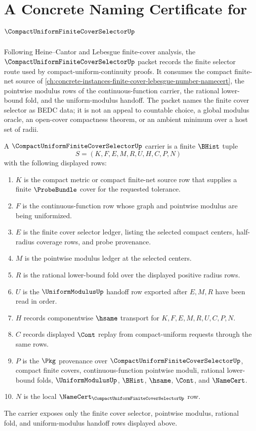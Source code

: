 \chapter{A Concrete Naming Certificate for $\CompactUniformFiniteCoverSelectorUp$}
\label{ch:concrete-instances-compact-uniform-finite-cover-selector-namecert}

Following Heine--Cantor and Lebesgue finite-cover analysis, the $\CompactUniformFiniteCoverSelectorUp$ packet records the finite selector route used by compact-uniform-continuity proofs. It consumes the compact finite-net source of \autoref{ch:concrete-instances-finite-cover-lebesgue-number-namecert}, the pointwise modulus rows of the continuous-function carrier, the rational lower-bound fold, and the uniform-modulus handoff. The packet names the finite cover selector as BEDC data; it is not an appeal to countable choice, a global modulus oracle, an open-cover compactness theorem, or an ambient minimum over a host set of radii.

\begin{definition}
\label{def:compact-uniform-finite-cover-selector-carrier}
A $\CompactUniformFiniteCoverSelectorUp$ carrier is a finite $\BHist$ tuple
$$
S=(K,F,E,M,R,U,H,C,P,N)
$$
with the following displayed rows:
\begin{enumerate}
\item $K$ is the compact metric or compact finite-net source row that supplies a finite $\ProbeBundle$ cover for the requested tolerance.
\item $F$ is the continuous-function row whose graph and pointwise modulus are being uniformized.
\item $E$ is the finite cover selector ledger, listing the selected compact centers, half-radius coverage rows, and probe provenance.
\item $M$ is the pointwise modulus ledger at the selected centers.
\item $R$ is the rational lower-bound fold over the displayed positive radius rows.
\item $U$ is the $\UniformModulusUp$ handoff row exported after $E,M,R$ have been read in order.
\item $H$ records componentwise $\hsame$ transport for $K,F,E,M,R,U,C,P,N$.
\item $C$ records displayed $\Cont$ replay from compact-uniform requests through the same rows.
\item $P$ is the $\Pkg$ provenance over $\CompactUniformFiniteCoverSelectorUp$, compact finite covers, continuous-function pointwise moduli, rational lower-bound folds, $\UniformModulusUp$, $\BHist$, $\hsame$, $\Cont$, and $\NameCert$.
\item $N$ is the local $\NameCert_{\CompactUniformFiniteCoverSelectorUp}$ row.
\end{enumerate}
The carrier exposes only the finite cover selector, pointwise modulus, rational fold, and uniform-modulus handoff rows displayed above.
\end{definition}

